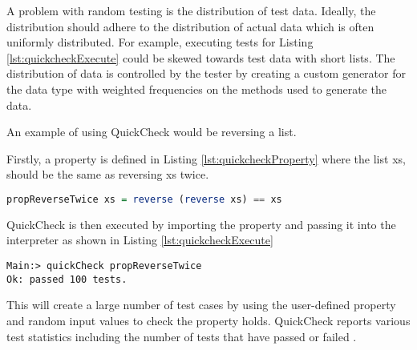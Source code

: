 A problem with random testing is the distribution of test data. Ideally, the distribution should adhere to the distribution of actual data which is often uniformly distributed. For example, executing tests for Listing \ref{lst:quickcheckExecute} could be skewed towards test data with short lists. The distribution of data is controlled by the tester by creating a custom generator for the data type with weighted frequencies on the methods used to generate the data.

An example of using QuickCheck would be reversing a list.

Firstly, a property is defined in Listing \ref{lst:quickcheckProperty} where the list xs, should be the same as reversing xs twice.

\begin{lstlisting}[language=haskell, label={lst:quickcheckProperty}, caption={Property for reversing a list in QuickCheck}]
propReverseTwice xs = reverse (reverse xs) == xs
\end{lstlisting}

QuickCheck is then executed by importing the property and passing it into the interpreter as shown in Listing \ref{lst:quickcheckExecute}

\begin{lstlisting}[label={lst:quickcheckExecute}, caption={Executing tests to check a list is reversed}]
Main:> quickCheck propReverseTwice
Ok: passed 100 tests.
\end{lstlisting}

This will create a large number of test cases by using the user-defined property and random input values to check the property holds. QuickCheck reports various test statistics including the number of tests that have passed or failed \cite{QClightweight}.


